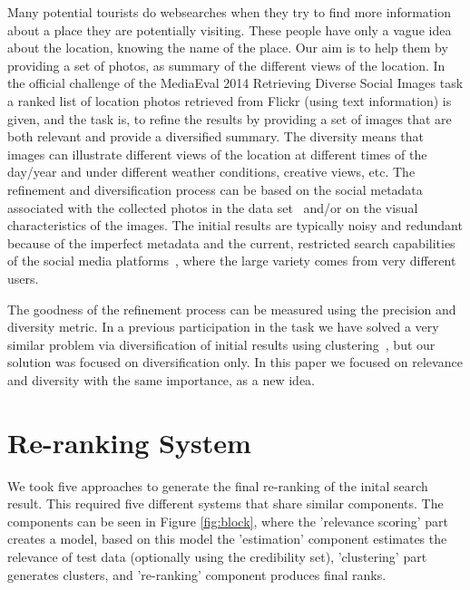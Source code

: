 \documentclass{acm_proc_article-me}
\begin{document}
Many potential tourists do websearches when they try to find more information about a place they are potentially visiting. These people have only a vague idea about the location, knowing the name of the place. Our aim is to help them by providing a set of photos, as summary of the different views of the location. 
In the official challenge of the MediaEval 2014 Retrieving Diverse Social Images task \cite{ionescu2014retrieving} a ranked list of location photos retrieved from Flickr (using text information) is given, and the task is, to refine the results by providing a set of images that are both relevant and provide a diversified summary. The diversity means that images can illustrate different views of the location at different times of the day/year and under different weather conditions, creative views, etc. The refinement and diversification process can be based on the social metadata associated with the collected photos in the data set~\cite{ionescu2014div400} and/or on the visual characteristics of the images. The initial results are typically noisy and redundant because of the imperfect metadata and the current, restricted search capabilities of the social media platforms~\cite{radu2014hybrid}, where the large variety comes from very different users. 

The goodness of the refinement process can be measured using the precision and diversity metric.
In a previous participation in the task we have solved a very similar problem via diversification of initial results using clustering~\cite{szHucs2013bmemtm}, but our solution was focused on diversification only. In this paper we focused on relevance and diversity with the same importance, as a new idea.

\pagebreak
\section{Re-ranking System}

We took five approaches to generate the final re-ranking of the inital search result. This required five different systems that share similar components. The components can be seen in Figure \ref{fig:block}, where the 'relevance scoring' part creates a model, based on this model the 'estimation' component estimates the relevance of test data (optionally using the credibility set), 'clustering' part generates clusters, and 're-ranking' component produces final ranks.
\end{document}
